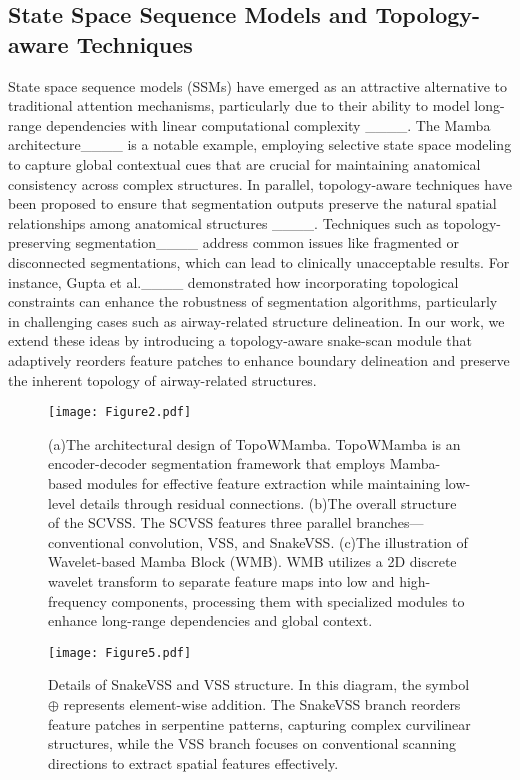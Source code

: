 \subsection{State Space Sequence Models and Topology-aware Techniques}
State space sequence models (SSMs) have emerged as an attractive alternative to traditional attention mechanisms, particularly due to their ability to model long-range dependencies with linear computational complexity ____. 
The Mamba architecture____ is a notable example, employing selective state space modeling to capture global contextual cues that are crucial for maintaining anatomical consistency across complex structures. 
In parallel, topology-aware techniques have been proposed to ensure that segmentation outputs preserve the natural spatial relationships among anatomical structures ____. 
Techniques such as topology-preserving segmentation____ address common issues like fragmented or disconnected segmentations, which can lead to clinically unacceptable results. 
For instance, Gupta et al.____ demonstrated how incorporating topological constraints can enhance the robustness of segmentation algorithms, particularly in challenging cases such as airway-related structure delineation.
In our work, we extend these ideas by introducing a topology-aware snake-scan module that adaptively reorders feature patches to enhance boundary delineation and preserve the inherent topology of airway-related structures.

\begin{figure*}[htbp]
\setlength{\abovecaptionskip}{2pt}
\setlength{\belowcaptionskip}{0pt}
\centering
\texttt{[image: Figure2.pdf]}
\caption{(a)The architectural design of TopoWMamba. TopoWMamba is an encoder-decoder segmentation framework that employs Mamba-based modules for effective feature extraction while maintaining low-level details through residual connections. (b)The overall structure of the SCVSS. The SCVSS features three parallel branches—conventional convolution, VSS, and SnakeVSS. (c)The illustration of Wavelet-based Mamba Block (WMB). WMB utilizes a 2D discrete wavelet transform to separate feature maps into low and high-frequency components, processing them with specialized modules to enhance long-range dependencies and global context.}
\label{fig:fig2}
\end{figure*}

\begin{figure}[htbp]
\centering
\texttt{[image: Figure5.pdf]}
\caption{Details of SnakeVSS and VSS structure. In this diagram, the symbol $\oplus$ represents element-wise addition. The SnakeVSS branch reorders feature patches in serpentine patterns, capturing complex curvilinear structures, while the VSS branch focuses on conventional scanning directions to extract spatial features effectively.}
\label{fig:fig4}
\end{figure}


